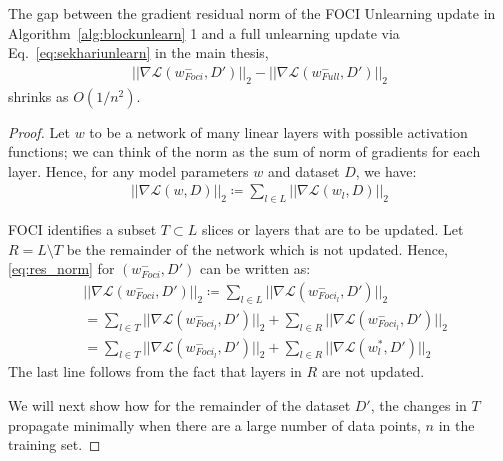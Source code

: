 \begin{lemma}
The gap between the gradient residual norm of the FOCI Unlearning update in Algorithm~\ref{alg:blockunlearn} 1 and a full unlearning update via Eq.~\eqref{eq:sekhariunlearn} in the main thesis,
\begin{align}
||\nabla \mathcal{L}(w^-_{Foci},D')||_2 - ||\nabla \mathcal{L}(w^-_{Full},D')||_2
\end{align}
shrinks as $O(1/n^2)$.
\end{lemma}
\begin{proof}
Let $w$ to be a network of many linear layers with possible activation functions; we can think of the norm as the sum of norm of gradients for each layer. Hence, for any model parameters $w$ and dataset $D$, we have:
\begin{align}
    \label{eq:res_norm}
    ||\nabla \mathcal{L}(w,D)||_2 \coloneqq \sum_{l \in L} ||\nabla \mathcal{L}(w_l, D) ||_2
\end{align}

FOCI identifies a subset $T \subset L$ slices or layers that are to be updated. 
Let $R = L \setminus T$ be the remainder of the network which is not updated.
Hence, \ref{eq:res_norm} for $(w^-_{Foci}, D')$ can be written as:
\begin{align}
    \label{eq:foci_res_norm}
    & ||\nabla \mathcal{L}(w^-_{Foci},D')||_2 \coloneqq \sum_{l \in L} ||\nabla \mathcal{L}(w^-_{Foci_l}, D') ||_2 \\
    & = \sum_{l \in T} ||\nabla \mathcal{L}(w^-_{Foci_l}, D') ||_2 + 
     \sum_{l \in R} ||\nabla \mathcal{L}(w^-_{Foci_l}, D') ||_2 \\
    & = \sum_{l \in T} ||\nabla \mathcal{L}(w^-_{Foci_l}, D') ||_2 + 
    \sum_{l \in R} ||\nabla \mathcal{L}(w^*_{l}, D') ||_2
\end{align}
The last line follows from the fact that layers in $R$ are not updated.

We will next show how for the remainder of the dataset $D'$, the changes in $T$ propagate minimally when there are a large number of data points, $n$ in the training set.


\end{proof}
